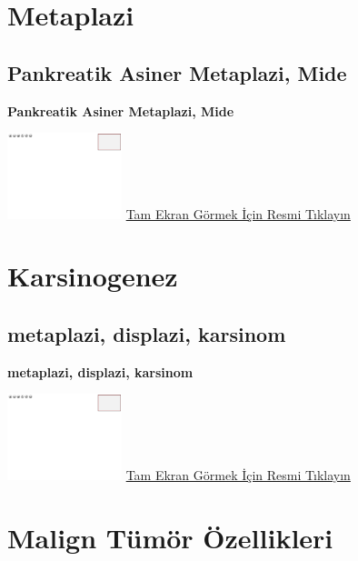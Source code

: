 \documentclass[
  letterpaper,
  DIV=11,
  numbers=noendperiod]{scrreprt}
\begin{document}
\hypertarget{sec-metaplazi}{%
\chapter{Metaplazi}\label{sec-metaplazi}}

\hypertarget{sec-pankreatik-asiner-metaplazi}{%
\section{Pankreatik Asiner Metaplazi,
Mide}\label{sec-pankreatik-asiner-metaplazi}}

\textbf{Pankreatik Asiner Metaplazi, Mide}

\href{https://images.patolojiatlasi.com/template/HE.html}{\includegraphics[width=0.25\textwidth,height=\textheight]{./screenshots/template_screenshot.png}}
\href{https://images.patolojiatlasi.com/metaplasia/HE.html}{Tam Ekran
Görmek İçin Resmi Tıklayın}

\hypertarget{sec-karsinogenez}{%
\chapter{Karsinogenez}\label{sec-karsinogenez}}

\hypertarget{sec-mepaplazi-displazi-karsinom}{%
\section{metaplazi, displazi,
karsinom}\label{sec-mepaplazi-displazi-karsinom}}

\textbf{metaplazi, displazi, karsinom}

\href{https://images.patolojiatlasi.com/template/HE.html}{\includegraphics[width=0.25\textwidth,height=\textheight]{./screenshots/template_screenshot.png}}
\href{https://images.patolojiatlasi.com/carcinogenesis/HE.html}{Tam
Ekran Görmek İçin Resmi Tıklayın}

\hypertarget{sec-malign-tumor-ozellikleri}{%
\chapter{Malign Tümör Özellikleri}\label{sec-malign-tumor-ozellikleri}}
\end{document}

